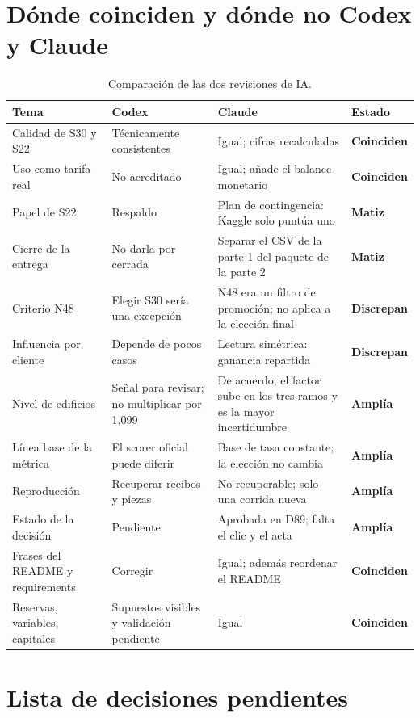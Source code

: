 \documentclass[11pt,a4paper]{article}
\newcommand{\coincide}{\textcolor{verde}{\sffamily\small\bfseries Coinciden}}
\newcommand{\matiz}{\textcolor{ambar}{\sffamily\small\bfseries Matiz}}
\newcommand{\discrepa}{\textcolor{rojo}{\sffamily\small\bfseries Discrepan}}
\newcommand{\amplia}{\textcolor{azul}{\sffamily\small\bfseries Amplía}}
\begin{document}
\section{Dónde coinciden y dónde no Codex y Claude}

\begin{table}[H]
\centering\small
\begin{tabularx}{\linewidth}{@{}P{3.2cm}LLP{1.9cm}@{}}
\toprule
Tema & Codex & Claude & Estado \\
\midrule
Calidad de S30 y S22 & Técnicamente consistentes & Igual; cifras recalculadas & \coincide \\
Uso como tarifa real & No acreditado & Igual; añade el balance monetario & \coincide \\
Papel de S22 & Respaldo & Plan de contingencia: Kaggle solo puntúa uno & \matiz \\
Cierre de la entrega & No darla por cerrada & Separar el CSV de la parte 1 del paquete de la parte 2 & \matiz \\
Criterio N48 & Elegir S30 sería una excepción & N48 era un filtro de promoción; no aplica a la elección final & \discrepa \\
Influencia por cliente & Depende de pocos casos & Lectura simétrica: ganancia repartida & \discrepa \\
Nivel de edificios & Señal para revisar; no multiplicar por 1,099 & De acuerdo; el factor sube en los tres ramos y es la mayor incertidumbre & \amplia \\
Línea base de la métrica & El scorer oficial puede diferir & Base de tasa constante; la elección no cambia & \amplia \\
Reproducción & Recuperar recibos y piezas & No recuperable; solo una corrida nueva & \amplia \\
Estado de la decisión & Pendiente & Aprobada en D89; falta el clic y el acta & \amplia \\
Frases del README y requirements & Corregir & Igual; además reordenar el README & \coincide \\
Reservas, variables, capitales & Supuestos visibles y validación pendiente & Igual & \coincide \\
\bottomrule
\end{tabularx}
\caption{Comparación de las dos revisiones de IA.}
\end{table}

\section{Lista de decisiones pendientes}
\end{document}
